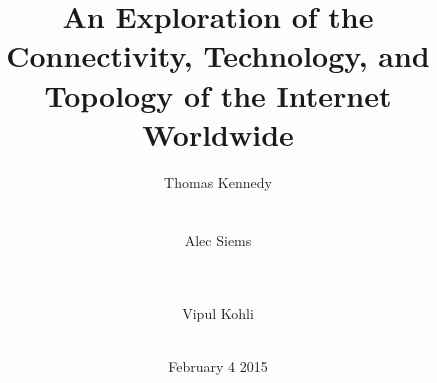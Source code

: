 \documentclass{sigcomm-alternate}
\begin{document}
%
\title{An Exploration of the Connectivity, Technology, and Topology of the Internet Worldwide} 
%
%
%
%
%
%
\author{
%
%
\alignauthor
{Thomas Kennedy}\\
       \\
       \\
\alignauthor
{Alec Siems}\\
       \\
       \\
\and  %
\alignauthor 
{Vipul Kohli}\\
       \\
}
\date{February 4 2015}
\end{document}
